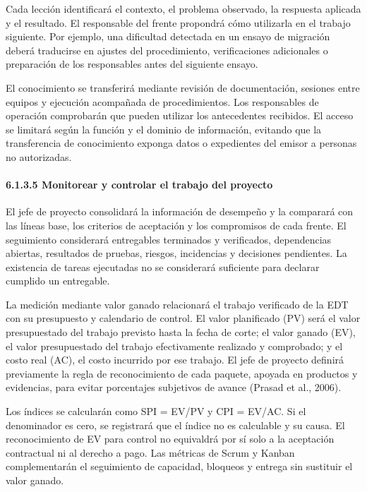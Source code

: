 \documentclass[11pt]{article}
\begin{document}
Cada lección identificará el contexto, el problema observado, la
respuesta aplicada y el resultado. El responsable del frente propondrá
cómo utilizarla en el trabajo siguiente. Por ejemplo, una dificultad
detectada en un ensayo de migración deberá traducirse en ajustes del
procedimiento, verificaciones adicionales o preparación de los
responsables antes del siguiente ensayo.

El conocimiento se transferirá mediante revisión de documentación,
sesiones entre equipos y ejecución acompañada de procedimientos. Los
responsables de operación comprobarán que pueden utilizar los
antecedentes recibidos. El acceso se limitará según la función y el
dominio de información, evitando que la transferencia de conocimiento
exponga datos o expedientes del emisor a personas no autorizadas.

\paragraph{6.1.3.5 Monitorear y controlar el trabajo del proyecto}\label{6-1-3-5-monitorear-y-controlar-el-trabajo-del-proyecto}

El jefe de proyecto consolidará la información de desempeño y la comparará con las líneas base, los criterios de aceptación y los compromisos de cada frente. El seguimiento considerará entregables terminados y verificados, dependencias abiertas, resultados de pruebas, riesgos, incidencias y decisiones pendientes. La existencia de tareas ejecutadas no se considerará suficiente para declarar cumplido un entregable.

La medición mediante valor ganado relacionará el trabajo verificado de
la EDT con su presupuesto y calendario de control. El valor planificado
(PV) será el valor presupuestado del trabajo previsto hasta la fecha de
corte; el valor ganado (EV), el valor presupuestado del trabajo
efectivamente realizado y comprobado; y el costo real (AC), el costo
incurrido por ese trabajo. El jefe de proyecto definirá previamente la
regla de reconocimiento de cada paquete, apoyada en productos y
evidencias, para evitar porcentajes subjetivos de avance (Prasad et al.,
2006).

Los índices se calcularán como SPI = EV/PV y CPI = EV/AC. Si el
denominador es cero, se registrará que el índice no es calculable y su
causa. El reconocimiento de EV para control no equivaldrá por sí solo a
la aceptación contractual ni al derecho a pago. Las métricas de Scrum y
Kanban complementarán el seguimiento de capacidad, bloqueos y entrega
sin sustituir el valor ganado.
\end{document}
